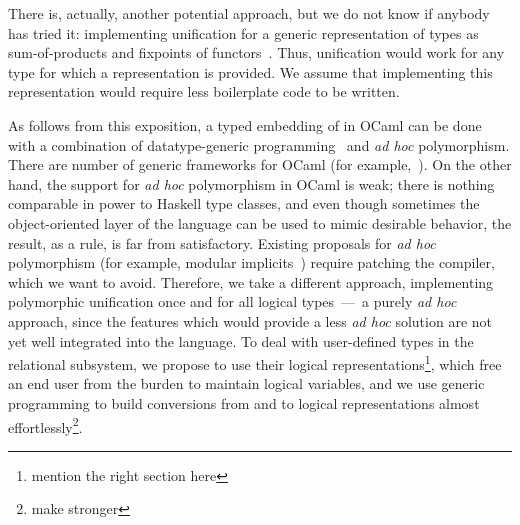 There is, actually, another potential approach, but we do not know if anybody has tried
it: implementing unification for a generic representation of types as sum-of-products and fixpoints of
functors~\cite{InstantGenerics, ALaCarte}. Thus, unification would work for any type for which a representation
is provided. We assume that implementing this representation would require less boilerplate code to be written.

As follows from this exposition, a typed embedding of \miniKanren in OCaml can be done with
a combination of datatype-generic programming~\cite{DGP} and \emph{ad hoc} polymorphism. There are 
number of generic frameworks for OCaml (for example,~\cite{Deriving}). On the other hand, the support
for \emph{ad hoc} polymorphism in OCaml is weak; there is nothing comparable in power to Haskell
type classes, and even though sometimes the object-oriented layer of the language can be used to mimic
desirable behavior, the result, as a rule, is far from satisfactory. Existing proposals for \emph{ad hoc} polymorphism (for example,
modular implicits~\cite{Implicits}) require patching the compiler, which we want to avoid. Therefore, we 
take a different approach, implementing polymorphic unification once and for all logical types~---~a purely \emph{ad hoc} 
approach, since the features which would provide a less \emph{ad hoc} solution are not yet well integrated into the language. To deal
with user-defined types in the relational subsystem, we propose to use their logical representations\footnote{mention the right section here}, which free an end user
from the burden to maintain logical variables, and we use generic programming to build conversions from and to logical
representations almost effortlessly\footnote{make stronger}.



